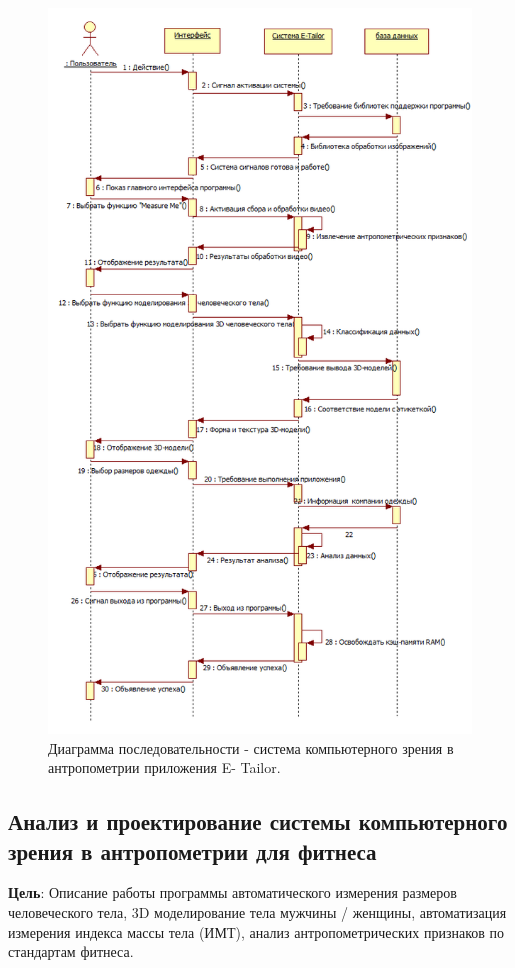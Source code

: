 \begin{figure}[ht!]
\centering
\includegraphics [scale=0.8] {images/h28.png}
\begin{center}
\caption{Диаграмма последовательности - система компьютерного зрения в антропометрии приложения E- Tailor.} \label{img28}
\end{center}
\end{figure}

\subsection{Анализ и проектирование системы компьютерного зрения в антропометрии для фитнеса}
\textbf{Цель}: Описание работы программы автоматического измерения размеров человеческого тела, 3D моделирование тела мужчины / женщины, автоматизация измерения индекса массы тела (ИМТ), анализ антропометрических признаков по стандартам фитнеса.

